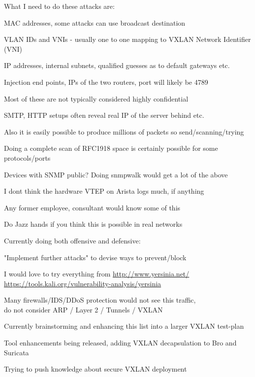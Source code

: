 \documentclass[Screen16to9,17pt,footrule]{foils}
\begin{document}
What I need to do these attacks are:
\begin{list2}
\item MAC addresses, some attacks can use broadcast destination
\item VLAN IDs and VNIs - usually one to one mapping to VXLAN Network Identifier (VNI)
\item IP addresses, internal subnets, qualified guesses as to default gateways etc.
\item Injection end points, IPs of the two routers, port will likely be 4789
\item Most of these are not typically considered highly confidential
\item SMTP, HTTP setups often reveal real IP of the server behind etc.
\item Also it is easily possible to produce millions of packets so send/scanning/trying
\item Doing a complete scan of RFC1918 space is certainly possible for some protocols/ports
\item Devices with SNMP public? Doing snmpwalk would get a lot of the above
\item I dont think the hardware VTEP on Arista logs much, if anything
\end{list2}

\vskip 1cm
Any former employee, consultant would know some of this

Do Jazz hands if you think this is possible in real networks


Currently doing both offensive and defensive:
\begin{list2}
\item "Implement further attacks" to devise ways to prevent/block
\item I would love to try everything from  \url{http://www.yersinia.net/}\\ \url{https://tools.kali.org/vulnerability-analysis/yersinia}
\item Many firewalls/IDS/DDoS protection would not see this traffic,\\
do not consider ARP / Layer 2 / Tunnels / VXLAN
\item Currently brainstorming and enhancing this list into a larger VXLAN test-plan
\item Tool enhancements being released, adding VXLAN decapsulation to Bro and Suricata
\item Trying to push knowledge about secure VXLAN deployment
\end{list2}
\end{document}
